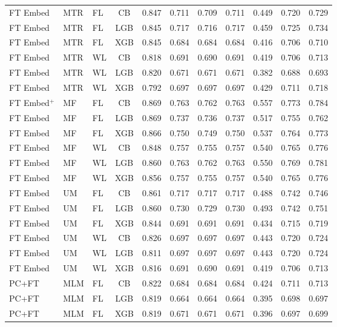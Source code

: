 \documentclass[9pt,a4paper]{article}
\begin{document}
\begin{scriptsize}
\begin{longtable}{lllcrrrrrrr}
FT Embed & MTR & FL & CB  & 0.847 & 0.711 & 0.709 & 0.711 & 0.449 & 0.720 & 0.729 \\
FT Embed & MTR & FL & LGB & 0.845 & 0.717 & 0.716 & 0.717 & 0.459 & 0.725 & 0.734 \\
FT Embed & MTR & FL & XGB & 0.845 & 0.684 & 0.684 & 0.684 & 0.416 & 0.706 & 0.710 \\
FT Embed & MTR & WL & CB  & 0.818 & 0.691 & 0.690 & 0.691 & 0.419 & 0.706 & 0.713 \\
FT Embed & MTR & WL & LGB & 0.820 & 0.671 & 0.671 & 0.671 & 0.382 & 0.688 & 0.693 \\
FT Embed & MTR & WL & XGB & 0.792 & 0.697 & 0.697 & 0.697 & 0.429 & 0.711 & 0.718 \\
FT Embed$^+$ & MF & FL & CB  & 0.869 & 0.763 & 0.762 & 0.763 & 0.557 & 0.773 & 0.784 \\
FT Embed & MF  & FL & LGB & 0.869 & 0.737 & 0.736 & 0.737 & 0.517 & 0.755 & 0.762 \\
FT Embed & MF  & FL & XGB & 0.866 & 0.750 & 0.749 & 0.750 & 0.537 & 0.764 & 0.773 \\
FT Embed & MF  & WL & CB  & 0.848 & 0.757 & 0.755 & 0.757 & 0.540 & 0.765 & 0.776 \\
FT Embed & MF  & WL & LGB & 0.860 & 0.763 & 0.762 & 0.763 & 0.550 & 0.769 & 0.781 \\
FT Embed & MF  & WL & XGB & 0.856 & 0.757 & 0.755 & 0.757 & 0.540 & 0.765 & 0.776 \\
FT Embed & UM  & FL & CB  & 0.861 & 0.717 & 0.717 & 0.717 & 0.488 & 0.742 & 0.746 \\
FT Embed & UM  & FL & LGB & 0.860 & 0.730 & 0.729 & 0.730 & 0.493 & 0.742 & 0.751 \\
FT Embed & UM  & FL & XGB & 0.844 & 0.691 & 0.691 & 0.691 & 0.434 & 0.715 & 0.719 \\
FT Embed & UM  & WL & CB  & 0.826 & 0.697 & 0.697 & 0.697 & 0.443 & 0.720 & 0.724 \\
FT Embed & UM  & WL & LGB & 0.811 & 0.697 & 0.697 & 0.697 & 0.443 & 0.720 & 0.724 \\
FT Embed & UM  & WL & XGB & 0.816 & 0.691 & 0.690 & 0.691 & 0.419 & 0.706 & 0.713 \\
\midrule
PC+FT & MLM & FL & CB  & 0.822 & 0.684 & 0.684 & 0.684 & 0.424 & 0.711 & 0.713 \\
PC+FT & MLM & FL & LGB & 0.819 & 0.664 & 0.664 & 0.664 & 0.395 & 0.698 & 0.697 \\
PC+FT & MLM & FL & XGB & 0.819 & 0.671 & 0.671 & 0.671 & 0.396 & 0.697 & 0.699 \\

\end{longtable}
\end{scriptsize}
\end{document}
